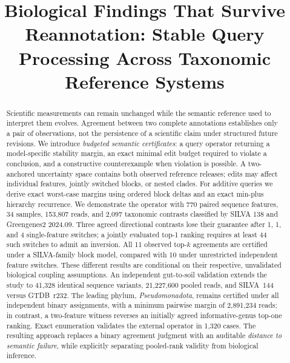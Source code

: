 \documentclass[conference]{IEEEtran}
\begin{document}
\title{Biological Findings That Survive Reannotation: Stable Query Processing Across Taxonomic Reference Systems}
\author{
}
\maketitle
\begin{abstract}
Scientific measurements can remain unchanged while the semantic reference used to interpret them evolves. Agreement between two complete annotations establishes only a pair of observations, not the persistence of a scientific claim under structured future revisions. We introduce \emph{budgeted semantic certificates}: a query operator returning a model-specific stability margin, an exact minimal edit budget required to violate a conclusion, and a constructive counterexample when violation is possible. A two-anchored uncertainty space contains both observed reference releases; edits may affect individual features, jointly switched blocks, or nested clades. For additive queries we derive exact worst-case margins using ordered block deltas and an exact min-plus hierarchy recurrence. We demonstrate the operator with 770 paired sequence features, 34 samples, 153,807 reads, and 2,097 taxonomic contrasts classified by SILVA 138 and Greengenes2 2024.09. Three agreed directional contrasts lose their guarantee after 1, 1, and 4 single-feature switches; a jointly evaluated top-1 ranking requires at least 44 such switches to admit an inversion. All 11 observed top-$k$ agreements are certified under a SILVA-family block model, compared with 10 under unrestricted independent feature switches. These different results are conditional on their respective, unvalidated biological coupling assumptions. An independent gut-to-soil validation extends the study to 41,328 identical sequence variants, 21,227,600 pooled reads, and SILVA~144 versus GTDB~r232. The leading phylum, \emph{Pseudomonadota}, remains certified under all independent binary assignments, with a minimum pairwise margin of 2,891,234 reads; in contrast, a two-feature witness reverses an initially agreed informative-genus top-one ranking. Exact enumeration validates the external operator in 1,320 cases. The resulting approach replaces a binary agreement judgment with an auditable \emph{distance to semantic failure}, while explicitly separating pooled-rank validity from biological inference.
\end{abstract}
\end{document}

